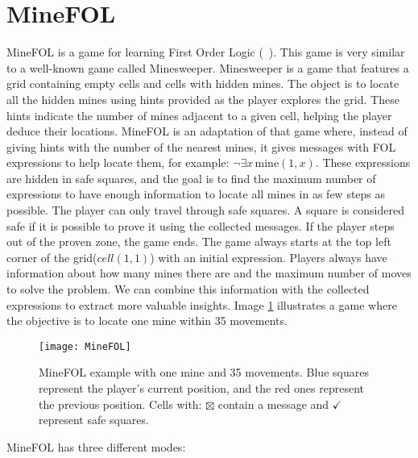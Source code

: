 \section{MineFOL}

MineFOL is a game for learning First Order Logic (~\cite{groza_minefol}). This game is very similar to a well-known game called Minesweeper. Minesweeper is a game that features a grid containing empty cells and cells with hidden mines. The object is to locate all the hidden mines using hints provided as the player explores the grid. These hints indicate the number of mines adjacent to a given cell, helping the player deduce their locations. 
MineFOL is an adaptation of that game where, instead of giving hints with the number of the nearest mines, it gives messages with \gls{FOL} expressions to help locate them, for example: \(\neg \exists x \, \text{mine}(1, x)\). These expressions are hidden in safe squares, and the goal is to find the maximum number of expressions to have enough information to locate all mines in as few steps as possible. The player can only travel through safe squares. A square is considered safe if it is possible to prove it using the collected messages. If the player steps out of the proven zone, the game ends. The game always starts at the top left corner of the grid(\(cell(1,1)\)) with an initial expression. Players always have information about how many mines there are and the maximum number of moves to solve the problem. We can combine this information with the collected expressions to extract more valuable insights. Image \ref{img:minefol} illustrates a game where the objective is to locate one mine within 35 movements.

\begin{figure}[htbp]
    \centering
    \texttt{[image: MineFOL]}
    \caption{MineFOL example with one mine and 35 movements. Blue squares represent the player's current position, and the red ones represent the previous position. Cells with: \(\boxtimes\) contain a message and \( \checkmark \) represent safe squares.}
    \label{img:minefol}
\end{figure}

MineFOL has three different modes:

